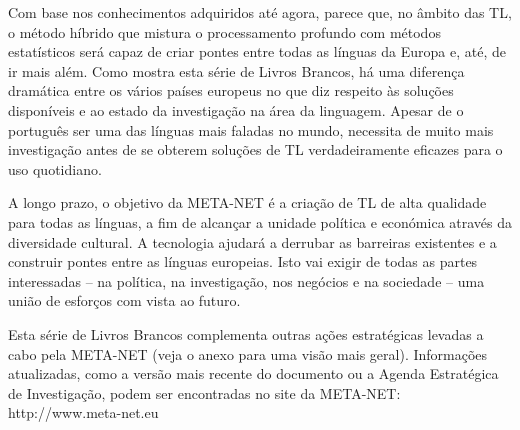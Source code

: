 \documentclass[]{../metanetpaper}
\begin{document}
\begin{multicols}{2}

Com base nos conhecimentos adquiridos até agora, parece que, no âmbito das TL, o método híbrido que mistura o processamento profundo com métodos estatísticos será capaz de criar pontes entre todas as línguas da Europa e, até, de ir mais além. Como mostra esta série de Livros Brancos, há uma di\-fe\-ren\-ça dramática entre os vários países europeus no que diz respeito às soluções disponíveis e ao estado da investigação na área da linguagem. Apesar de o português ser uma das línguas mais faladas no mundo, necessita de muito mais investigação antes de se obterem soluções de TL verdadeiramente eficazes para o uso quotidiano.

A longo prazo, o objetivo da META-NET é a criação de TL de alta qualidade para todas as línguas, a fim de alcançar a unidade política e económica através da diversidade cultural. A tecnologia ajudará a derrubar as barreiras existentes e a construir pontes entre as línguas europeias. Isto vai exigir de todas as partes interessadas – na política, na investigação, nos negócios e na sociedade – uma união de esforços com vista ao futuro.

Esta série de Livros Brancos complementa outras ações estratégicas levadas a cabo pela META-NET (veja o anexo para uma visão mais geral). Informações atualizadas, como a versão mais recente do documento\cite{Meta1}  ou a Agenda Estratégica de Investigação, podem ser encontradas no site da META-NET: http://www.meta-net.eu
\end{multicols}

\clearpage


\end{document}
